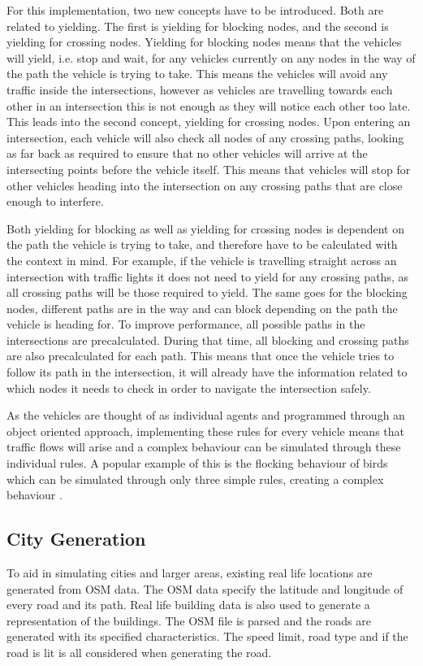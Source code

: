     For this implementation, two new concepts have to be introduced. Both are related to yielding. The first is yielding for blocking nodes, and the second is yielding for crossing nodes. Yielding for blocking nodes means that the vehicles will yield, i.e. stop and wait, for any vehicles currently on any nodes in the way of the path the vehicle is trying to take. This means the vehicles will avoid any traffic inside the intersections, however as vehicles are travelling towards each other in an intersection this is not enough as they will notice each other too late. This leads into the second concept, yielding for crossing nodes. Upon entering an intersection, each vehicle will also check all nodes of any crossing paths, looking as far back as required to ensure that no other vehicles will arrive at the intersecting points before the vehicle itself. This means that vehicles will stop for other vehicles heading into the intersection on any crossing paths that are close enough to interfere.

    Both yielding for blocking as well as yielding for crossing nodes is dependent on the path the vehicle is trying to take, and therefore have to be calculated with the context in mind. For example, if the vehicle is travelling straight across an intersection with traffic lights it does not need to yield for any crossing paths, as all crossing paths will be those required to yield. The same goes for the blocking nodes, different paths are in the way and can block depending on the path the vehicle is heading for. To improve performance, all possible paths in the intersections are precalculated. During that time, all blocking and crossing paths are also precalculated for each path. This means that once the vehicle tries to follow its path in the intersection, it will already have the information related to which nodes it needs to check in order to navigate the intersection safely.

    As the vehicles are thought of as individual agents and programmed through an object oriented approach, implementing these rules for every vehicle means that traffic flows will arise and a complex behaviour can be simulated through these individual rules. A popular example of this is the flocking behaviour of birds which can be simulated through only three simple rules, creating a complex behaviour \cite{flocking-behaviour}.

\subsection{City Generation}
    To aid in simulating cities and larger areas, existing real life locations are generated from OSM data. The OSM data specify the latitude and longitude of every road and its path. Real life building data is also used to generate a representation of the buildings. The OSM file is parsed and the roads are generated with its specified characteristics. The speed limit, road type and if the road is lit is all considered when generating the road.  

